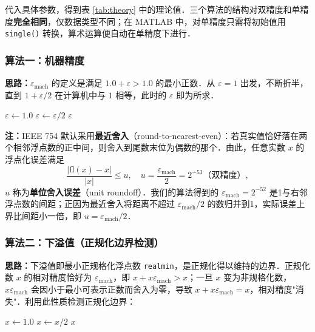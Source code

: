 \documentclass[UTF8,a4paper,11pt]{article}
\newcommand*{\rmk}{\textbf{注：}}
\newcommand\e{\leftarrow}
\begin{document}
代入具体参数，得到表 \ref{tab:theory} 中的理论值．三个算法的结构对双精度和单精度\textbf{完全相同}，仅数据类型不同；在 MATLAB 中，对单精度只需将初始值用 \texttt{single()} 转换，算术运算便自动在单精度下进行．

\subsubsection*{算法一：机器精度}

\textbf{思路：}$\varepsilon_{\mathrm{mach}}$ 的定义是满足 $1.0 + \varepsilon > 1.0$ 的最小正数．从 $\varepsilon=1$ 出发，不断折半，直到 $1+\varepsilon/2$ 在计算机中与 $1$ 相等，此时的 $\varepsilon$ 即为所求．

\begin{algorithm}[H]
    \caption{求机器精度}
    \begin{algorithmic}[1]
        \State $\varepsilon \e 1.0$
            \State $\varepsilon \e \varepsilon / 2$
        \EndWhile
        \State \Return $\varepsilon$
    \end{algorithmic}
\end{algorithm}

\rmk IEEE 754 默认采用\textbf{最近舍入}（round-to-nearest-even）：若真实值恰好落在两个相邻浮点数的正中间，则舍入到尾数末位为偶数的那个．由此，任意实数 $x$ 的浮点化误差满足
$$\frac{|\mathrm{fl}(x)-x|}{|x|} \le u, \quad u = \frac{\varepsilon_{\mathrm{mach}}}{2} = 2^{-53} \text{（双精度）},$$
$u$ 称为\textbf{单位舍入误差}（unit roundoff）．我们的算法得到的 $\varepsilon_{\mathrm{mach}}=2^{-52}$ 是1与右邻浮点数的间距；正因为最近舍入将距离不超过 $\varepsilon_{\mathrm{mach}}/2$ 的数归并到1，实际误差上界比间距小一倍，即 $u=\varepsilon_{\mathrm{mach}}/2$．

\subsubsection*{算法二：下溢值（正规化边界检测）}

\textbf{思路：}下溢值即最小正规格化浮点数 \texttt{realmin}，是正规化得以维持的边界．正规化数 $x$ 的相对精度恰好为 $\varepsilon_{\mathrm{mach}}$，即 $x + x\varepsilon_{\mathrm{mach}} > x$；一旦 $x$ 变为非规格化数，$x\varepsilon_{\mathrm{mach}}$ 会因小于最小可表示正数而舍入为零，导致 $x + x\varepsilon_{\mathrm{mach}} = x$，相对精度"消失"．利用此性质检测正规化边界：

\begin{algorithm}[H]
    \caption{求下溢值（正规化边界检测）}
    \begin{algorithmic}[1]
        \State $x \e 1.0$
            \State $x \e x/2$
        \EndWhile
        \State \Return $x$ 
    \end{algorithmic}
\end{algorithm}
\end{document}
